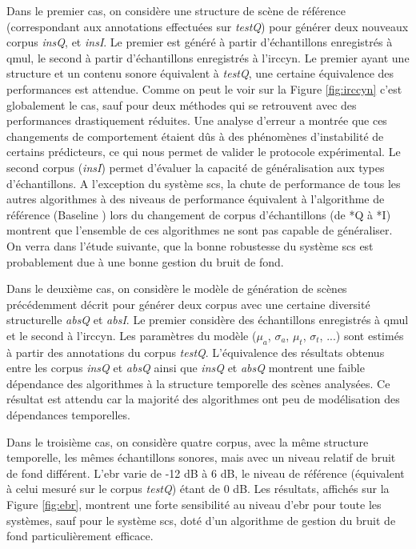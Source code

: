 Dans le premier cas, on considère une structure de scène de référence (correspondant aux annotations effectuées sur \emph{testQ}) pour générer deux nouveaux corpus \emph{insQ}, et \emph{insI}. Le premier est généré à partir d'échantillons enregistrés à qmul, le second à partir d'échantillons enregistrés à l'irccyn. Le premier ayant une structure et un contenu sonore équivalent à \emph{testQ}, une certaine équivalence des performances est attendue. Comme on peut le voir sur la Figure \ref{fig:irccyn} c'est globalement le cas, sauf pour deux méthodes qui se retrouvent avec des performances drastiquement réduites. Une analyse d'erreur a montrée que ces changements de comportement étaient dûs à des phénomènes d'instabilité de certains prédicteurs, ce qui nous permet de valider le protocole expérimental. Le second corpus (\emph{insI}) permet d'évaluer la capacité de généralisation aux types d'échantillons. A l'exception du système scs, la chute de performance de tous les autres algorithmes à des niveaus de performance équivalent à l'algorithme de référence (\og Baseline \fg) lors du changement de corpus d'échantillons (de *Q à *I) montrent que l'ensemble de ces algorithmes ne sont pas capable de généraliser. On verra dans l'étude suivante, que la bonne robustesse du système scs est probablement due à une bonne gestion du bruit de fond.

Dans le deuxième cas, on considère le modèle de génération de scènes précédemment décrit pour générer deux corpus avec une certaine diversité structurelle \emph{absQ} et \emph{absI}. Le premier considère des échantillons enregistrés à qmul et le second à l'irccyn. Les paramètres du modèle ($\mu_a$, $\sigma_a$, $\mu_t$, $\sigma_t$, ...) sont estimés à partir des annotations du corpus \emph{testQ}. L'équivalence des résultats obtenus entre les corpus \emph{insQ} et \emph{absQ} ainsi que \emph{insQ} et \emph{absQ} montrent une faible dépendance des algorithmes à la structure temporelle des scènes analysées. Ce résultat est attendu car la majorité des algorithmes ont peu de modélisation des dépendances temporelles.

Dans le troisième cas, on considère quatre corpus, avec la même structure temporelle, les mêmes échantillons sonores, mais avec un niveau relatif de bruit de fond différent. L'ebr varie de -12 dB à 6 dB, le niveau de référence (équivalent à celui mesuré sur le corpus \emph{testQ})  étant de 0 dB. Les résultats, affichés sur la Figure \ref{fig:ebr}, montrent une forte sensibilité au niveau d'ebr pour toute les systèmes, sauf pour le système scs, doté d'un algorithme de gestion du bruit de fond particulièrement efficace.~\cite{lafayhal-01111381}

